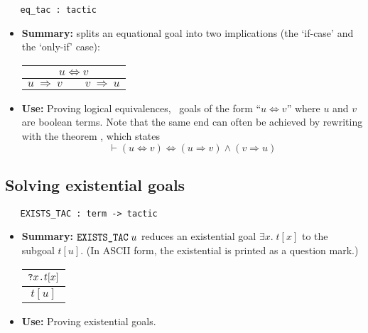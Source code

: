 \begin{holboxed}
\begin{verbatim}
   eq_tac : tactic
\end{verbatim}
\end{holboxed}

\begin{itemize}

\item{\bf Summary:}
 splits an equational goal into two implications (the `if-case' and the `only-if' case):

\begin{center}
\begin{tabular}{c} \\
$u \iff v$
\\ \hline \hline
$u\ \Rightarrow\ v \qquad v\ \Rightarrow\ u$
\\
\end{tabular}
\end{center}

\item{\bf Use:}
Proving logical equivalences, \ie\ goals of the form ``$u\iff v$'' where $u$ and $v$ are boolean terms.
Note that the same end can often be achieved by rewriting with the theorem , which states
\[
\vdash (u \iff v) \iff (u \Rightarrow v) \land (v \Rightarrow u)
\]

\end{itemize}

\subsection{Solving existential goals}


\begin{holboxed}
\begin{verbatim}
   EXISTS_TAC : term -> tactic
\end{verbatim}
\end{holboxed}

\begin{itemize}

\item{\bf Summary:}
$\ml{EXISTS\_TAC}\;u$ reduces an existential goal $\exists x.\;t[x]$ to the subgoal $t[u]$.
(In ASCII form, the existential is printed as a question mark.)

\begin{center}
\begin{tabular}{c} \\
$\ml{?}x\ml{.} t[x]$
\\ \hline \hline
$t[u]$
\\
\end{tabular}
\end{center}

\item{\bf Use:} Proving existential goals.

\end{itemize}

